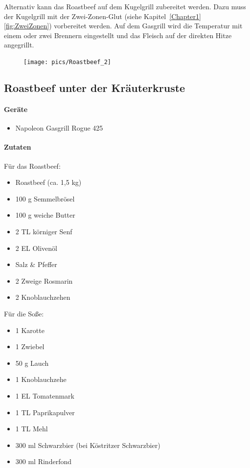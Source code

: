 Alternativ kann das Roastbeef auf dem Kugelgrill zubereitet werden. Dazu
muss der Kugelgrill mit der Zwei-Zonen-Glut (siehe Kapitel~\ref{Chapter1} 
\vref{fig:ZweiZonen}) vorbereitet werden. Auf dem
Gasgrill wird die Temperatur mit einem oder zwei Brennern eingestellt und
das Fleisch auf der direkten Hitze angegrillt.
\newpage
\begin{figure}[htbp]
	\centering
	\begin{minipage}{1\textwidth}
		\centering
		\texttt{[image: pics/Roastbeef\_2]}
		\label{fig:Roastbeef}
	\end{minipage}
\end{figure}
\newpage

\subsection{Roastbeef unter der Kräuterkruste}

\paragraph{Geräte}

\begin{itemize}[noitemsep]
	\item Napoleon Gasgrill Rogue 425
\end{itemize}

\paragraph{Zutaten}

Für das Roastbeef:

\begin{itemize}[noitemsep]
	\item Roastbeef (ca. 1,5 kg) 
	\item 100 g Semmelbrösel
	\item 100 g weiche Butter
	\item 2 TL körniger Senf
	\item 2 EL Olivenöl
	\item Salz  \& Pfeffer
	\item 2 Zweige Rosmarin
	\item 2 Knoblauchzehen
\end{itemize}

Für die Soße:

\begin{itemize}[noitemsep]
\item 1 Karotte
\item 1 Zwiebel
\item 50 g Lauch
\item 1 Knoblauchzehe
\item 1 EL Tomatenmark
\item 1 TL Paprikapulver
\item 1 TL Mehl
\item 300 ml Schwarzbier (bei Köstritzer Schwarzbier)
\item 300 ml Rinderfond
\end{itemize}
\newpage

